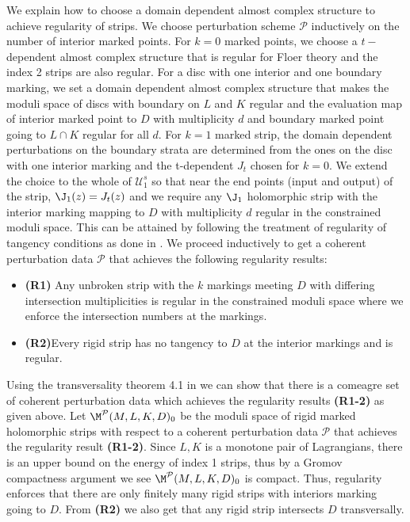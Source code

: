 We explain how to choose a domain dependent almost complex structure to achieve regularity of strips. We choose perturbation scheme $\mathcal{P}$ inductively on the number of interior marked points. For $k=0$ marked points, we choose a $t-$dependent almost complex structure that is regular for Floer theory and the index 2 strips are also regular. For a disc with one interior and one boundary marking, we set a domain dependent almost complex structure that makes the moduli space of discs with boundary on $L$ and $K$ regular and the evaluation map of interior marked point to $D$ with multiplicity $d$ and boundary marked point going to $L\cap K$ regular for all $d$.  For $k=1$ marked strip, the domain dependent perturbations on the boundary strata  are determined from the ones on the disc with one interior marking and the t-dependent $J_t$ chosen for $k=0$. We extend the choice to the whole of $\mathcal{U}^s_1$ so that near the end points (input and output) of the strip, $\J_1(z)= J_t(z)$ and we require any $\J_1$ holomorphic strip with the interior marking mapping to $D$ with multiplicity $d$ regular in the constrained moduli space. This can be attained by following the treatment of regularity of tangency conditions as done in \cite{CMtrans}. We proceed inductively to get a coherent perturbation data $\mathcal{P}$ that achieves the following regularity results:
\begin{itemize}
    \item  \textbf{(R1)} Any unbroken strip with the $k$ markings meeting $D$ with differing intersection multiplicities is regular in the constrained moduli space where we enforce the intersection numbers at the markings.
    \item \textbf{(R2)}Every rigid strip has no tangency to $D$ at the interior markings and is regular.
\end{itemize}

Using the transversality theorem 4.1 in \cite{charwoodstabil} we can show that there is a comeagre set of coherent perturbation data which achieves the regularity results \textbf{(R1-2)} as given above. Let $\M^{\mathcal{P}}(M,L,K,D)_0$ be the moduli space of rigid marked holomorphic strips with respect to a coherent perturbation data $\mathcal{P}$ that achieves the regularity result \textbf{(R1-2)}. Since $L,K$ is a  monotone pair of Lagrangians, there is an upper bound on the energy of index 1 strips, thus by a Gromov compactness argument we see $\M^{\mathcal{P}}(M,L,K,D)_0$ is compact. Thus, regularity enforces that there are only finitely many rigid strips with interiors marking going to $D$. From \textbf{(R2)} we also get that any rigid strip intersects $D$ transversally.


